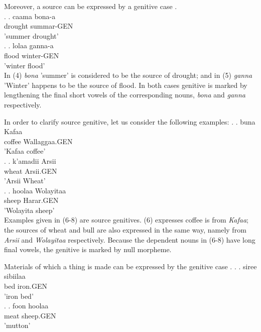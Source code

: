 \documentclass[11pt,a4paper]{article}
\begin{document}
	
	Moreover, a source can be expressed by a genitive case \cite[69]{greenlee1950genitive}. \\
	
	\ex.
	\ag.
	caama bona-a\\
	drought summar-GEN\\
	'summer drought'\\
	
	\ex.
	\ag.
	lolaa ganna-a\\
	flood winter-GEN\\
	'winter flood'\\
	
	In (4) \emph{bona} 'summer' is considered to be the source of drought; and in (5) \emph{ganna} 'Winter' happens to be the source of flood. In both cases genitive is marked by lengthening the final short vowels of the corresponding nouns, \emph{bona} and \emph{ganna} respectively. 
	
	In order to clarify source genitive, let us consider the following examples:
	\ex.
	\ag.
	buna Kafaa\\
	coffee Wallaggaa.GEN\\
	'Kafaa coffee'\\
	
	\ex.
	\ag.
	k'amadii Arsii\\
	wheat Arsii.GEN\\
	'Arsii Wheat'\\
	
	\ex.
	\ag.
	hoolaa Wolayitaa\\
	sheep Harar.GEN\\
	'Wolayita sheep'\\
	
	Examples given in (6-8) are source genitives. (6) expresses coffee is from \emph{Kafaa}; the sources of wheat and bull are also expressed in the same way, namely from \emph{Arsii} and \emph{Wolayitaa} respectively. Because the dependent nouns in (6-8) have long final vowels, the genitive is marked by null morpheme. 
	
	Materials of which a thing is made can be expressed by the genitive case \cite[69]{greenlee1950genitive}.
	\ex.
	\ag.
	siree sibiilaa\\
	bed iron.GEN\\
	'iron bed'\\
	
	\ex.
	\ag.
	foon hoolaa\\
	meat sheep.GEN\\
	'mutton'\\
	
\end{document}
